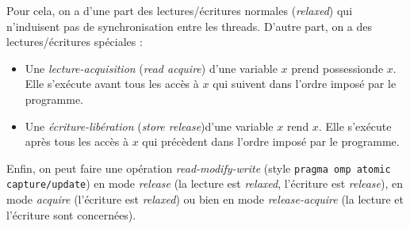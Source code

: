Pour cela, on a d'une part des lectures/écritures \og normales\fg
(\emph{relaxed}) qui n'induisent pas de synchronisation entre les
threads. D'autre part, on a des lectures/écritures spéciales :
\begin{itemize}
\item Une \emph{lecture-acquisition} (\emph{read acquire}) d'une variable $x$
  \og prend possession\fg de $x$. Elle s'exécute avant tous les accès à $x$ qui
  suivent dans l'ordre imposé par le programme.

\item Une \emph{écriture-libération} (\emph{store release})d'une variable $x$
  \og rend \fg $x$. Elle s'exécute après tous les accès à $x$ qui précèdent dans
  l'ordre imposé par le programme.
\end{itemize}

Enfin, on peut faire une opération \og\emph{read-modify-write}\fg{} (style
\texttt{pragma omp atomic capture/update}) en mode \emph{release} (la lecture
est \emph{relaxed}, l'écriture est \emph{release}), en mode \emph{acquire}
(l'écriture est \emph{relaxed}) ou bien en mode \emph{release-acquire} (la
lecture et l'écriture sont concernées).


\begin{center}
\end{center}


